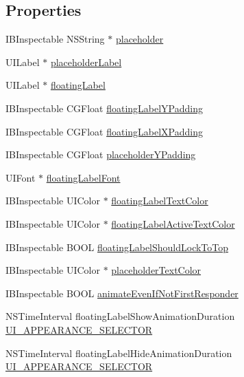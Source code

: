 \subsection*{Properties}
\begin{DoxyCompactItemize}
\item 
I\+B\+Inspectable N\+S\+String $\ast$ \hyperlink{interface_j_v_float_labeled_text_view_a8abe506cc556e72fb0e77cc884f7192d}{placeholder}
\item 
U\+I\+Label $\ast$ \hyperlink{interface_j_v_float_labeled_text_view_ab90f8f526a28fcae4d4a1c264826cb4d}{placeholder\+Label}
\item 
U\+I\+Label $\ast$ \hyperlink{interface_j_v_float_labeled_text_view_a9267bda83c69a187acf332dd71bd6eb1}{floating\+Label}
\item 
I\+B\+Inspectable C\+G\+Float \hyperlink{interface_j_v_float_labeled_text_view_a407df8e8312fa50a95182e1b69360257}{floating\+Label\+Y\+Padding}
\item 
I\+B\+Inspectable C\+G\+Float \hyperlink{interface_j_v_float_labeled_text_view_a856de4f1de19833103a41b1f733f235b}{floating\+Label\+X\+Padding}
\item 
I\+B\+Inspectable C\+G\+Float \hyperlink{interface_j_v_float_labeled_text_view_afd73224d1c6564d0db5a36934fbd4909}{placeholder\+Y\+Padding}
\item 
U\+I\+Font $\ast$ \hyperlink{interface_j_v_float_labeled_text_view_a714359739c5a39e8bcd9dbc4cade6972}{floating\+Label\+Font}
\item 
I\+B\+Inspectable U\+I\+Color $\ast$ \hyperlink{interface_j_v_float_labeled_text_view_a037211938698f45a06a31d0c492e5632}{floating\+Label\+Text\+Color}
\item 
I\+B\+Inspectable U\+I\+Color $\ast$ \hyperlink{interface_j_v_float_labeled_text_view_aeafbd8422f4d37317d1dc65c5827d884}{floating\+Label\+Active\+Text\+Color}
\item 
I\+B\+Inspectable B\+O\+O\+L \hyperlink{interface_j_v_float_labeled_text_view_a62884c0e053aaf577df9c10b111d164e}{floating\+Label\+Should\+Lock\+To\+Top}
\item 
I\+B\+Inspectable U\+I\+Color $\ast$ \hyperlink{interface_j_v_float_labeled_text_view_ada674f4ce304734239a459d1d2c822f1}{placeholder\+Text\+Color}
\item 
I\+B\+Inspectable B\+O\+O\+L \hyperlink{interface_j_v_float_labeled_text_view_a2d654f540a5f9878e31f7583cc05f6f1}{animate\+Even\+If\+Not\+First\+Responder}
\item 
N\+S\+Time\+Interval floating\+Label\+Show\+Animation\+Duration \hyperlink{interface_j_v_float_labeled_text_view_ac4b09dae01394be968952a684e92adb4}{U\+I\+\_\+\+A\+P\+P\+E\+A\+R\+A\+N\+C\+E\+\_\+\+S\+E\+L\+E\+C\+T\+O\+R}
\item 
N\+S\+Time\+Interval floating\+Label\+Hide\+Animation\+Duration \hyperlink{interface_j_v_float_labeled_text_view_ac0ed6f92806ad02cad8caa5d643620f4}{U\+I\+\_\+\+A\+P\+P\+E\+A\+R\+A\+N\+C\+E\+\_\+\+S\+E\+L\+E\+C\+T\+O\+R}
\end{DoxyCompactItemize}


